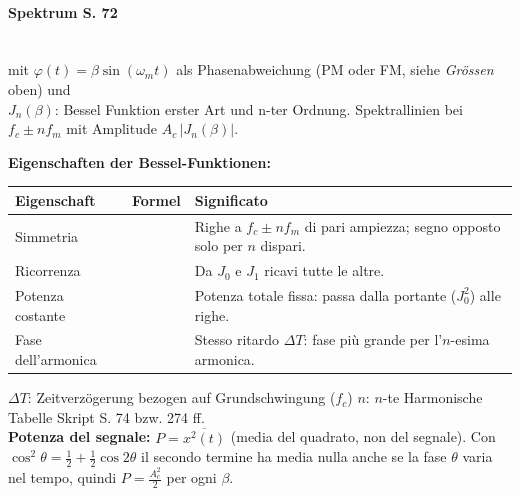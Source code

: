 \paragraph{Spektrum S. 72}
\vspace{.1cm}
 \\
mit $\varphi(t) = \beta\sin(\omega_m t)$ als Phasenabweichung (PM oder FM, siehe \emph{Grössen} oben) und \\$J_n(\beta)$: Bessel Funktion erster Art und n-ter Ordnung. Spektrallinien bei $f_c \pm n f_m$ mit Amplitude $A_c\,|J_n(\beta)|$.

\begin{center}
	
\end{center}
\vspace{-.3cm}
\textbf{Eigenschaften der Bessel-Funktionen:}

{\renewcommand{\arraystretch}{1.3}
\begin{tabularx}{\linewidth}{|>{\raggedright\arraybackslash}p{.2\linewidth}|>{\centering\arraybackslash}p{.34\linewidth}|>{\raggedright\arraybackslash}X|}
	\hline
	\textbf{Eigenschaft} & \textbf{Formel} & \textbf{Significato} \\ \hline
	Simmetria & \efbox[linecolor=red]{$J_{-n}(\beta) = (-1)^n\cdot J_n(\beta)$} & Righe a $f_c \pm n f_m$ di pari ampiezza; segno opposto solo per $n$ dispari. \\ \hline
	Ricorrenza & \efbox[linecolor=red]{$J_{n-1}(\beta) + J_{n+1}(\beta) = \dfrac{2n}{\beta} \cdot J_n(\beta)$} & Da $J_0$ e $J_1$ ricavi tutte le altre. \\ \hline
	Potenza costante & \efbox[linecolor=red]{$\displaystyle \sum_{n=-\infty}^{\infty} J^2_n (\beta) = 1$} & Potenza totale fissa: passa dalla portante ($J_0^2$) alle righe. \\ \hline
	Fase dell'armonica & \efbox[linecolor=red]{$\beta_n = \Delta T \cdot 2\pi \cdot n \cdot f_c$} & Stesso ritardo $\Delta T$: fase più grande per l'$n$-esima armonica. \\ \hline
\end{tabularx}}

{\small $\Delta T$: Zeitverzögerung bezogen auf Grundschwingung ($f_c$) \quad $n$: $n$-te Harmonische \quad Tabelle Skript S. 74 bzw. 274 ff.}\\[4pt]
\textbf{Potenza del segnale:} $P=\overline{x^2(t)}$ (media del quadrato, non del segnale). Con $\cos^2\theta=\frac12+\frac12\cos 2\theta$ il secondo termine ha media nulla anche se la fase $\theta$ varia nel tempo, quindi $P=\frac{A_c^2}{2}$ per ogni $\beta$.


